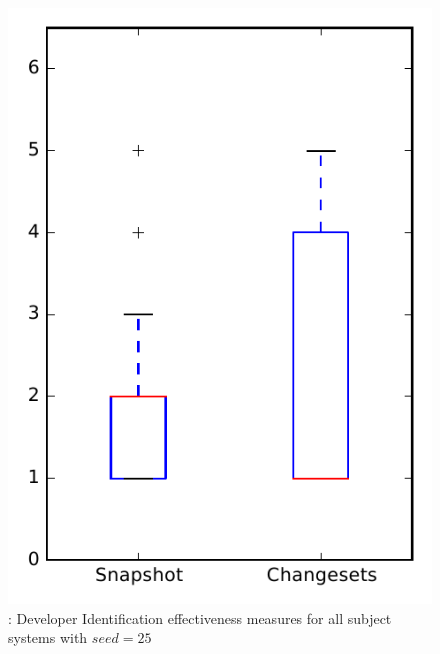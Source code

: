 
\begin{figure}
\centering
\includegraphics[height=0.4\textheight]{figures/dit_seed/rq1_overview_25}
\caption{\rtwo: Developer Identification effectiveness measures for all subject systems with $seed=25$}
\label{fig:dit_seed:rq1:overview}
\end{figure}
